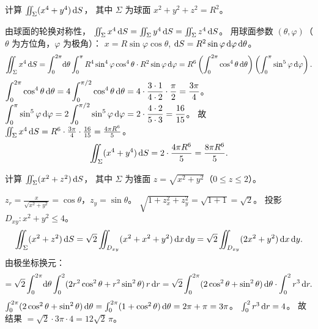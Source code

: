 \documentclass{article}
\begin{document}
\begin{exercise}
  计算 $\iint_\Sigma (x^4+y^4) \,\mathrm{d} S$，
  其中 $\Sigma$ 为球面 $x^2+y^2+z^2 = R^2$。
\end{exercise}

\begin{solution}
  由球面的轮换对称性，
  $\iint_\Sigma x^4 \,\mathrm{d} S = \iint_\Sigma y^4 \,\mathrm{d} S = \iint_\Sigma z^4 \,\mathrm{d} S$。
  用球面参数 $(\theta, \varphi)$（$\theta$ 为方位角，$\varphi$ 为极角）：
  $x = R\sin\varphi\cos\theta$, $\mathrm{d} S = R^2\sin\varphi\,\mathrm{d}\varphi\,\mathrm{d}\theta$。
  \[
    \iint_\Sigma x^4 \,\mathrm{d} S
    = \int_0^{2\pi}\!\mathrm{d}\theta \int_0^\pi R^4\sin^4\varphi\cos^4\theta \cdot R^2\sin\varphi\,\mathrm{d}\varphi
    = R^6 \left(\int_0^{2\pi}\cos^4\theta\,\mathrm{d}\theta\right)
      \left(\int_0^\pi \sin^5\varphi\,\mathrm{d}\varphi\right).
  \]
  $\displaystyle\int_0^{2\pi}\cos^4\theta\,\mathrm{d}\theta
    = 4\int_0^{\pi/2}\cos^4\theta\,\mathrm{d}\theta
    = 4\cdot\frac{3\cdot 1}{4\cdot 2}\cdot\frac{\pi}{2} = \frac{3\pi}{4}$。
  $\displaystyle\int_0^\pi \sin^5\varphi\,\mathrm{d}\varphi
    = 2\int_0^{\pi/2}\sin^5\varphi\,\mathrm{d}\varphi
    = 2\cdot\frac{4\cdot 2}{5\cdot 3} = \frac{16}{15}$。
  故 $\iint_\Sigma x^4 \,\mathrm{d} S = R^6 \cdot \frac{3\pi}{4} \cdot \frac{16}{15}
    = \frac{4\pi R^6}{5}$。
  \[
    \iint_\Sigma (x^4+y^4) \,\mathrm{d} S = 2 \cdot \frac{4\pi R^6}{5} = \frac{8\pi R^6}{5}.
  \]
\end{solution}

\begin{exercise}
  计算 $\iint_\Sigma (x^2+z^2) \,\mathrm{d} S$，
  其中 $\Sigma$ 为锥面 $z = \sqrt{x^2+y^2}$（$0 \le z \le 2$）。
\end{exercise}

\begin{solution}
  $z_r = \frac{x}{\sqrt{x^2+y^2}} = \cos\theta$，$z_y = \sin\theta$。
  $\sqrt{1+z_x^2+z_y^2} = \sqrt{1+1} = \sqrt{2}$。
  投影 $D_{xy}: x^2+y^2 \le 4$。
  \[
    \iint_\Sigma (x^2+z^2) \,\mathrm{d} S
    = \sqrt{2} \iint_{D_{xy}} (x^2+x^2+y^2) \,\mathrm{d} x\,\mathrm{d} y
    = \sqrt{2} \iint_{D_{xy}} (2x^2+y^2) \,\mathrm{d} x\,\mathrm{d} y.
  \]
  由极坐标换元：
  \[
    = \sqrt{2} \int_0^{2\pi}\!\mathrm{d}\theta \int_0^2 (2r^2\cos^2\theta + r^2\sin^2\theta)\, r\,\mathrm{d} r
    = \sqrt{2} \int_0^{2\pi}(2\cos^2\theta+\sin^2\theta)\,\mathrm{d}\theta \cdot \int_0^2 r^3 \,\mathrm{d} r.
  \]
  $\int_0^{2\pi}(2\cos^2\theta+\sin^2\theta)\,\mathrm{d}\theta
    = \int_0^{2\pi}(1+\cos^2\theta)\,\mathrm{d}\theta
    = 2\pi + \pi = 3\pi$。
  $\int_0^2 r^3 \,\mathrm{d} r = 4$。
  故结果 $= \sqrt{2} \cdot 3\pi \cdot 4 = 12\sqrt{2}\,\pi$。
\end{solution}
\end{document}
